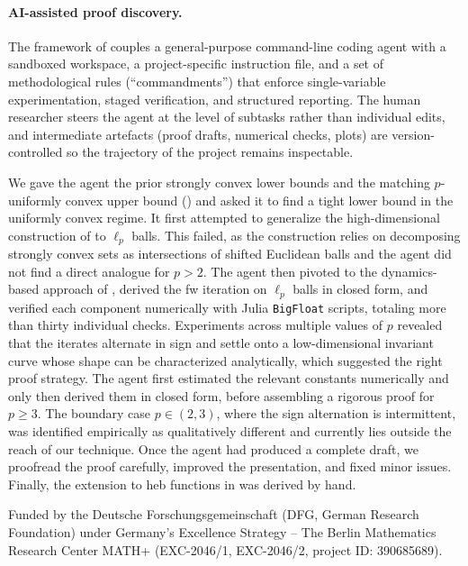 \documentclass{article}
\begin{document}
\paragraph{AI-assisted proof discovery.}
The framework of \citep{zimmer2026agentic} couples a general-purpose command-line coding agent with a sandboxed workspace, a project-specific instruction file, and a set of methodological rules (``commandments'') that enforce single-variable experimentation, staged verification, and structured reporting.
The human researcher steers the agent at the level of subtasks rather than individual edits, and intermediate artefacts (proof drafts, numerical checks, plots) are version-controlled so the trajectory of the project remains inspectable.

We gave the agent the prior strongly convex lower bounds and the matching $p$-uniformly convex upper bound () and asked it to find a tight lower bound in the uniformly convex regime.
It first attempted to generalize the high-dimensional construction of \citet{grimmer2026uniform} to $\ell_p$ balls.
This failed, as the construction relies on decomposing strongly convex sets as intersections of shifted Euclidean balls and the agent did not find a direct analogue for $p>2$.
The agent then pivoted to the dynamics-based approach of \citet{halbey2026lower}, derived the \gls{fw} iteration on $\ell_p$ balls in closed form, and verified each component numerically with Julia \texttt{BigFloat} scripts, totaling more than thirty individual checks.
Experiments across multiple values of $p$ revealed that the iterates alternate in sign and settle onto a low-dimensional invariant curve whose shape can be characterized analytically, which suggested the right proof strategy.
The agent first estimated the relevant constants numerically and only then derived them in closed form, before assembling a rigorous proof for $p\ge 3$.
The boundary case $p\in(2,3)$, where the sign alternation is intermittent, was identified empirically as qualitatively different and currently lies outside the reach of our technique.
Once the agent had produced a complete draft, we proofread the proof carefully, improved the presentation, and fixed minor issues.
Finally, the extension to \gls{heb} functions in  was derived by hand.


\begin{ack}
    Funded by the Deutsche Forschungsgemeinschaft (DFG, German Research Foundation) under Germany's Excellence Strategy – The Berlin Mathematics Research Center MATH+ (EXC-2046/1, EXC-2046/2, project ID: 390685689).
\end{ack}
\end{document}
